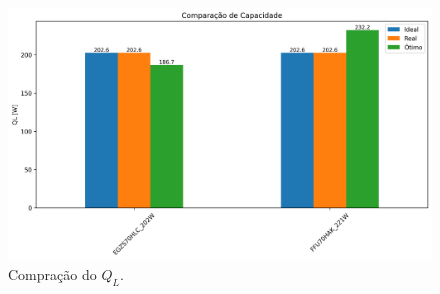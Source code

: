 \begin{figure}[h]
    \centering
    \includegraphics[width=0.8\linewidth]{Imagens/Desenvolvimento/barras_QL.png}
    \caption{Compração do $Q_L$.}
    \label{fig:barras Ql}
\end{figure}

